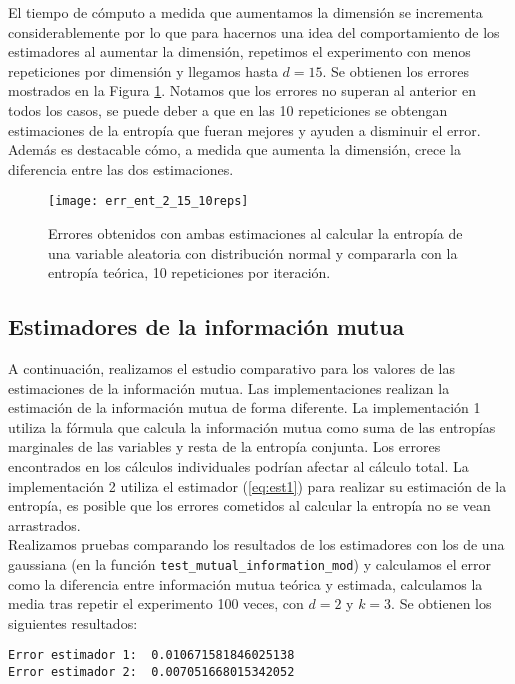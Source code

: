 \documentclass[12pt,a4paper]{report} %
\theoremstyle{definition}
\begin{document}
El tiempo de cómputo a medida que aumentamos la dimensión se incrementa considerablemente por lo que para hacernos una idea del comportamiento de los estimadores al aumentar la dimensión, repetimos el experimento con menos repeticiones por dimensión y llegamos hasta $d = 15$. Se obtienen los errores mostrados en la Figura \ref{fig:err_ent15}. Notamos que los errores no superan al anterior en todos los casos, se puede deber a que en las 10 repeticiones se obtengan estimaciones de la entropía que fueran mejores y ayuden a disminuir el error. Además es destacable cómo, a medida que aumenta la dimensión, crece la diferencia entre las dos estimaciones.\\

\begin{figure}[H]
    \centering
    \texttt{[image: err\_ent\_2\_15\_10reps]}
    \caption{Errores obtenidos con ambas estimaciones al calcular la entropía de una variable aleatoria con distribución normal y compararla con la entropía teórica, 10 repeticiones por iteración.}
    \label{fig:err_ent15}
\end{figure}

\subsection{Estimadores de la información mutua}

A continuación, realizamos el estudio comparativo para los valores de las estimaciones de la información mutua. Las implementaciones realizan la estimación de la información mutua de forma diferente. La implementación 1 utiliza la fórmula que calcula la información mutua como suma de las entropías marginales de las variables y resta de la entropía conjunta. Los errores encontrados en los cálculos individuales podrían afectar al cálculo total. La implementación 2 utiliza el estimador (\ref{eq:est1}) para realizar su estimación de la entropía, es posible que los errores cometidos al calcular la entropía no se vean arrastrados.\\

Realizamos pruebas comparando los resultados de los estimadores con los de una gaussiana (en la función \texttt{test\_mutual\_information\_mod}) y calculamos el error como la diferencia entre información mutua teórica y estimada, calculamos la media tras repetir el experimento 100 veces, con $d=2$ y $k=3$. Se obtienen los siguientes resultados:\\

\begin{lstlisting}
Error estimador 1:  0.010671581846025138
Error estimador 2:  0.007051668015342052

\end{lstlisting}
\end{document}
